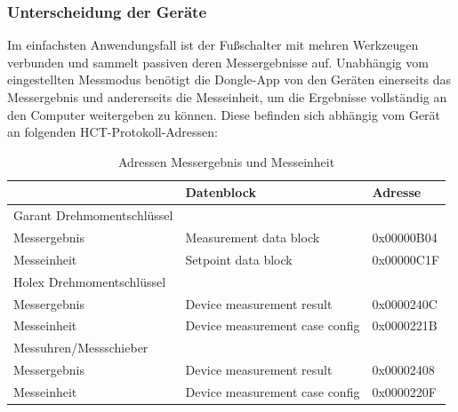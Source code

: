 \subsubsection{Unterscheidung der Geräte}
Im einfachsten Anwendungsfall ist der Fußschalter mit mehren Werkzeugen verbunden und sammelt passiven deren Messergebnisse auf. Unabhängig vom eingestellten Messmodus benötigt die Dongle-App von den Geräten einerseits das Messergebnis und andererseits die Messeinheit, um die Ergebnisse vollständig an den Computer weitergeben zu können. Diese befinden sich abhängig vom Gerät an folgenden \ac{HCT}-Protokoll-Adressen:

\begin{table}[H]
	\centering
	\begin{tabular}[H]{l|l|l}
		 & Datenblock & Adresse \\
		\hline
		Garant Drehmomentschlüssel & & \\
		Messergebnis & Measurement data block & 0x00000B04 \\
		Messeinheit & Setpoint data block & 0x00000C1F \\
		\hline
		Holex Drehmomentschlüssel & & \\
		Messergebnis & Device measurement result & 0x0000240C \\
		Messeinheit & Device measurement case config & 0x0000221B \\
		\hline
		Messuhren/Messschieber & & \\
		Messergebnis & Device measurement result & 0x00002408 \\
		Messeinheit & Device measurement case config & 0x0000220F \\
		
	\end{tabular}
	\caption{Adressen Messergebnis und Messeinheit}
\end{table}

